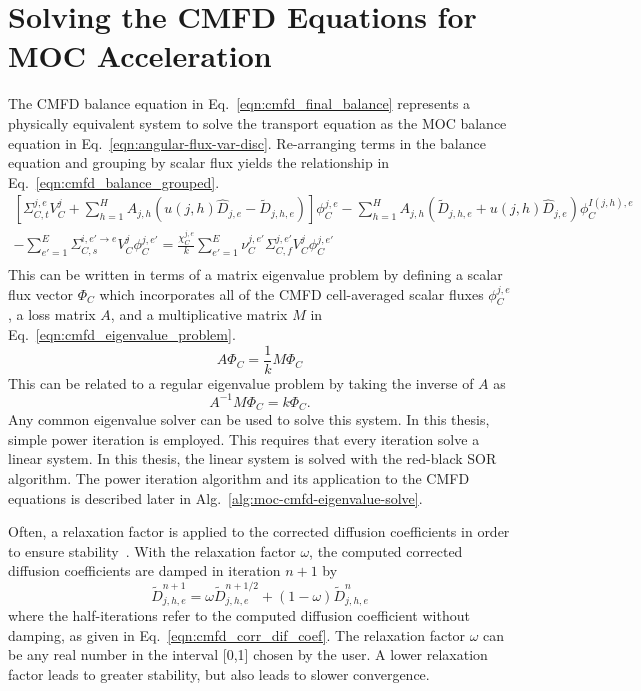 \section{Solving the CMFD Equations for MOC Acceleration}
The \ac{CMFD} balance equation in Eq.~\ref{eqn:cmfd_final_balance} represents a physically equivalent system to solve the transport equation as the \ac{MOC} balance equation in Eq.~\ref{eqn:angular-flux-var-disc}. Re-arranging terms in the balance equation and grouping by scalar flux yields the relationship in Eq.~\ref{eqn:cmfd_balance_grouped}.
\begin{equation}
	\begin{split}
		\left[\Sigma_{C,t}^{j,e} V_C^j + \sum_{h=1}^H A_{j,h} \left(u(j,h) \hat{D}_{j,e} - \tilde{D}_{j,h,e} \right) \right] \phi_C^{j,e} - \sum_{h=1}^H A_{j,h} \left( \tilde{D}_{j,h,e} + u(j,h) \hat{D}_{j,e} \right) \phi_C^{I(j,h),e} & \\ - \sum_{e'=1}^E  \Sigma_{C,s}^{i, e' \rightarrow e} V_C^j \phi_C^{j,e'} =
		\frac{\chi_C^{j,e}}{k} \sum_{e'=1}^{E} \nu_C^{j, e'} \Sigma_{C,f}^{j,e'} V_C^j \phi_C^{j,e'} & \\
	\end{split}
	\label{eqn:cmfd_balance_grouped}
\end{equation}
This can be written in terms of a matrix eigenvalue problem by defining a scalar flux vector $\Phi_C$ which incorporates all of the \ac{CMFD} cell-averaged scalar fluxes $\phi_C^{j,e}$, a loss matrix $A$, and a multiplicative matrix $M$ in Eq.~\ref{eqn:cmfd_eigenvalue_problem}.
\begin{equation}
	A \Phi_C = \frac{1}{k} M \Phi_C
	\label{eqn:cmfd_eigenvalue_problem}
\end{equation}
This can be related to a regular eigenvalue problem by taking the inverse of $A$ as
\begin{equation}
	A^{-1} M \Phi_C = k \Phi_C.
\end{equation}
Any common eigenvalue solver can be used to solve this system. In this thesis, simple power iteration is employed. This requires that every iteration solve a linear system. In this thesis, the linear system is solved with the red-black SOR algorithm. The power iteration algorithm and its application to the \ac{CMFD} equations is described later in Alg.~\ref{alg:moc-cmfd-eigenvalue-solve}.

Often, a relaxation factor is applied to the corrected diffusion coefficients in order to ensure stability~\cite{smith2002casmo}. With the relaxation factor $\omega$, the computed corrected diffusion coefficients are damped in iteration $n+1$ by
\begin{equation}
\tilde{D}_{j,h,e}^{n+1} = \omega \tilde{D}_{j,h,e}^{n+1/2} + (1-\omega) \tilde{D}_{j,h,e}^{n}
\label{eq:cmfd_damp_corr_dif_coef}
\end{equation}
where the half-iterations refer to the computed diffusion coefficient without damping, as given in Eq.~\ref{eqn:cmfd_corr_dif_coef}. The relaxation factor $\omega$ can be any real number in the interval [0,1] chosen by the user. A lower relaxation factor leads to greater stability, but also leads to slower convergence.

